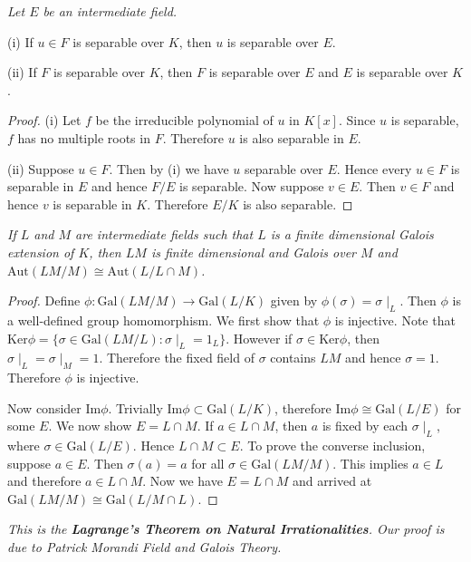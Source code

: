 \begin{problem}\em
Let $E$ be an intermediate field.\par
(i) If $u\in F$ is separable over $K$, then $u$ is separable over $E$.\par
(ii) If $F$ is separable over $K$, then $F$ is separable over $E$ and $E$ is separable over $K$.
\end{problem}
\begin{proof}
(i) Let $f$ be the irreducible polynomial of $u$ in $K[x]$. Since $u$ is separable, $f$ has no multiple roots in $F$. Therefore $u$ is also separable in $E$.\par
(ii) Suppose $u\in F$. Then by (i) we have $u$ separable over $E$. Hence every $u\in F$ is separable in $E$ and hence $F/E$ is separable. Now suppose $v\in E$. Then $v\in F$ and hence $v$ is separable in $K$. Therefore $E/K$ is also separable.
\end{proof}
\begin{problem}\em
If $L$ and $M$ are intermediate fields such that $L$ is a finite dimensional Galois extension of $K$, then $LM$ is finite dimensional and Galois over $M$ and $\mathrm{Aut}(LM/M)\cong \mathrm{Aut}(L/L\cap M)$.
\end{problem}
\begin{proof}
Define $\phi:\mathrm{Gal}(LM/M)\to\mathrm{Gal}(L/K)$ given by $\phi(\sigma)=\sigma\mid_L$. Then $\phi$ is a well-defined group homomorphism. We first show that $\phi$ is injective. Note that $\mathrm{Ker}\phi=\{\sigma\in\mathrm{Gal}(LM/L):\sigma\mid_L=1_L\}$. However if $\sigma\in\mathrm{Ker}\phi$, then $\sigma\mid_L=\sigma\mid_M=1$. Therefore the fixed field of $\sigma$ contains $LM$ and hence $\sigma=1$. Therefore $\phi$ is injective.\par
Now consider $\mathrm{Im}\phi$. Trivially $\mathrm{Im}\phi\subset\mathrm{Gal}(L/K)$, therefore $\mathrm{Im}\phi\cong\mathrm{Gal}(L/E)$ for some $E$. We now show $E=L\cap M$. If $a\in L\cap M$, then $a$ is fixed by each $\sigma\mid_L$, where $\sigma\in\mathrm{Gal}(L/E)$. Hence $L\cap M\subset E$. To prove the converse inclusion, suppose $a\in E$. Then $\sigma(a)=a$ for all $\sigma\in\mathrm{Gal}(LM/M)$. This implies $a\in L$ and therefore $a\in L\cap M$. Now we have $E=L\cap M$ and arrived at $\mathrm{Gal}(LM/M)\cong\mathrm{Gal}(L/M\cap L)$.
\end{proof}
\begin{note}\em
This is the \textbf{Lagrange's Theorem on Natural Irrationalities}. Our proof is due to Patrick Morandi \textit{Field and Galois Theory}.
\end{note}
